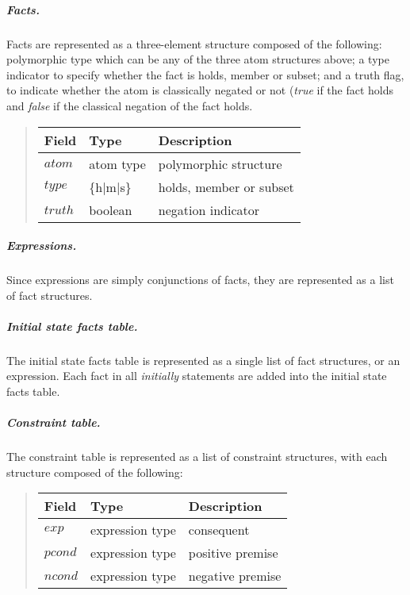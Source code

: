 \documentclass[10pt, twocolumn]{article}
\begin{document}
          \subparagraph{Facts.}

            Facts are represented as a three-element structure composed of the
            following: polymorphic type which can be any of the three atom
            structures above; a type indicator to specify whether the fact is
            holds, member or subset; and a truth flag, to indicate whether the
            atom is classically negated or not ({\em true} if the fact holds
            and {\em false} if the classical negation of the fact holds.

            \begin{quote}
              \begin{tabular}[t]{|l|l|l|}
                \hline
                \textbf{Field} & \textbf{Type} & \textbf{Description} \\
                \hline
                $atom$ & atom type & polymorphic structure \\
                \hline
                $type$ & \{h$|$m$|$s\} & holds, member or subset \\
                \hline
                $truth$ & boolean & negation indicator \\
                \hline
              \end{tabular}
            \end{quote}

          \subparagraph{Expressions.}

            Since expressions are simply conjunctions of facts, they are
            represented as a list of fact structures.

          \subparagraph{Initial state facts table.}

            The initial state facts table is represented as a single list of
            fact structures, or an expression. Each fact in all {\em initially}
            statements are added into the initial state facts table.

          \subparagraph{Constraint table.}

            The constraint table is represented as a list of constraint
            structures, with each structure composed of the following:

            \begin{quote}
              \begin{tabular}[t]{|l|l|l|}
                \hline
                \textbf{Field} & \textbf{Type} & \textbf{Description} \\
                \hline
                $exp$ & expression type & consequent \\
                \hline
                $pcond$ & expression type & positive premise \\
                \hline
                $ncond$ & expression type & negative premise \\
                \hline
              \end{tabular}
            \end{quote}
\end{document}
